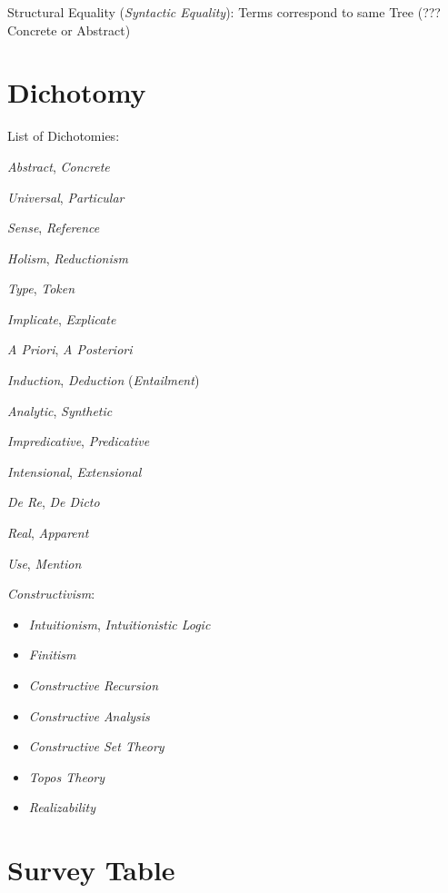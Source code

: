 Structural Equality (\emph{Syntactic Equality}): Terms correspond to
same Tree (??? Concrete or Abstract)



\section{Dichotomy}\label{sec:dichotomy}

List of Dichotomies:

\emph{Abstract}, \emph{Concrete}

\emph{Universal}, \emph{Particular}

\emph{Sense}, \emph{Reference}

\emph{Holism}, \emph{Reductionism}

\emph{Type}, \emph{Token}

\emph{Implicate}, \emph{Explicate}

\emph{A Priori}, \emph{A Posteriori}

\emph{Induction}, \emph{Deduction} (\emph{Entailment})

\emph{Analytic}, \emph{Synthetic}

\emph{Impredicative}, \emph{Predicative}

\emph{Intensional}, \emph{Extensional}

\emph{De Re}, \emph{De Dicto}

\emph{Real}, \emph{Apparent}

\emph{Use}, \emph{Mention}

\emph{Constructivism}:
\begin{itemize}
    \item \emph{Intuitionism}, \emph{Intuitionistic Logic}
    \item \emph{Finitism}
    \item \emph{Constructive Recursion}
    \item \emph{Constructive Analysis}
    \item \emph{Constructive Set Theory}
    \item \emph{Topos Theory}
    \item \emph{Realizability}
\end{itemize}



\section{Survey Table}

